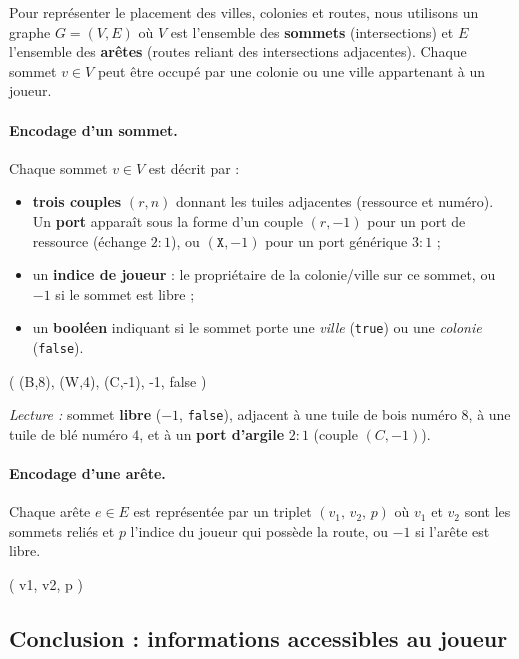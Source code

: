 \documentclass[11pt,a4paper]{article}
\begin{document}
Pour représenter le placement des villes, colonies et routes, nous utilisons un graphe
$G = (V, E)$ où $V$ est l'ensemble des \textbf{sommets} (intersections) et $E$
l'ensemble des \textbf{arêtes} (routes reliant des intersections adjacentes). Chaque
sommet $v \in V$ peut être occupé par une colonie ou une ville appartenant à un joueur.

\paragraph{Encodage d'un sommet.} Chaque sommet $v \in V$ est décrit par :
\begin{itemize}[nosep]
  \item \textbf{trois couples} $(\mathit{r}, n)$ donnant les tuiles adjacentes
        (ressource et numéro). Un \textbf{port} apparaît sous la forme d'un couple
        $(\mathit{r}, -1)$ pour un port de ressource (échange $2{:}1$), ou
        $(\mathtt{X}, -1)$ pour un port générique $3{:}1$ ;
  \item un \textbf{indice de joueur} : le propriétaire de la colonie/ville sur ce
        sommet, ou $-1$ si le sommet est libre ;
  \item un \textbf{booléen} indiquant si le sommet porte une \emph{ville}
        (\texttt{true}) ou une \emph{colonie} (\texttt{false}).
\end{itemize}

\begin{encodage}
( (B,8), (W,4), (C,-1), -1, false )
\end{encodage}

\noindent
\emph{Lecture :} sommet \textbf{libre} ($-1$, \texttt{false}), adjacent à une tuile de
bois numéro $8$, à une tuile de blé numéro $4$, et à un \textbf{port d'argile} $2{:}1$
(couple $(C,-1)$).

\paragraph{Encodage d'une arête.} Chaque arête $e \in E$ est représentée par un triplet
$(v_1,\, v_2,\, p)$ où $v_1$ et $v_2$ sont les sommets reliés et $p$ l'indice du joueur
qui possède la route, ou $-1$ si l'arête est libre.

\begin{encodage}
( v1, v2, p )
\end{encodage}

\subsection{Conclusion : informations accessibles au joueur}
\end{document}
